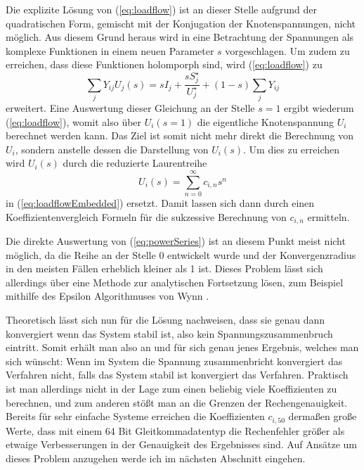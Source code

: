 \documentclass[12pt,a4paper]{article}
\newcommand{\refeq}[1]{{(\ref{eq:#1})}}
\begin{document}
	Die explizite Lösung von \refeq{loadflow} ist an dieser Stelle aufgrund der quadratischen Form, gemischt mit der Konjugation der Knotenspannungen, nicht möglich. Aus diesem Grund heraus wird in \cite{helmPatentSept2009} eine Betrachtung der Spannungen als komplexe Funktionen in einem neuen Parameter $s$ vorgeschlagen. Um zudem zu erreichen, dass diese Funktionen holomporph sind, wird \refeq{loadflow} zu 
	\begin{equation}
		\sum_j Y_{ij} U_{j}(s) = s I_j + \frac{s S_j^\star}{U_j^\star} + (1 - s) \sum_j Y_{ij}
		\label{eq:loadflowEmbedded}
	\end{equation}
	erweitert. Eine Auswertung dieser Gleichung an der Stelle $s = 1$ ergibt wiederum \refeq{loadflow}, womit also über $U_i(s = 1)$ die eigentliche Knotenspannung $U_i$ berechnet werden kann. Das Ziel ist somit nicht mehr direkt die Berechnung von $U_i$, sondern anstelle dessen die Darstellung von $U_i(s)$. Um dies zu erreichen wird $U_i(s)$ durch die reduzierte Laurentreihe 
	\begin{equation}
		U_i(s) = \sum_{n = 0}^\infty c_{i,n} s^n
		\label{eq:powerSeries}
	\end{equation}
	in \refeq{loadflowEmbedded} ersetzt. Damit lassen sich dann durch einen Koeffizientenvergleich Formeln für die sukzessive Berechnung von $c_{i,n}$ ermitteln.
	
	Die direkte Auswertung von \refeq{powerSeries} ist an diesem Punkt meist nicht möglich, da die Reihe an der Stelle 0 entwickelt wurde und der Konvergenzradius in den meisten Fällen erheblich kleiner als 1 ist. Dieses Problem lässt sich allerdings über eine Methode zur analytischen Fortsetzung lösen, zum Beispiel mithilfe des Epsilon Algorithmuses von Wynn \cite{epsilonWynn}.
	
	Theoretisch lässt sich nun für die Lösung nachweisen, dass sie genau dann konvergiert wenn das System stabil ist, also kein Spannungszusammenbruch eintritt. Somit erhält man also an und für sich genau jenes Ergebnis, welches man sich wünscht: Wenn im System die Spannung zusammenbricht konvergiert das Verfahren nicht, falls das System stabil ist konvergiert das Verfahren. Praktisch ist man allerdings nicht in der Lage zum einen beliebig viele Koeffizienten zu berechnen, und zum anderen stößt man an die Grenzen der Rechengenauigkeit. Bereits für sehr einfache Systeme erreichen die Koeffizienten $c_{i,50}$ dermaßen große Werte, dass mit einem 64 Bit Gleitkommadatentyp die Rechenfehler größer als etwaige Verbesserungen in der Genauigkeit des Ergebnisses sind. Auf Ansätze um dieses Problem anzugehen werde ich im nächsten Abschnitt eingehen.
	
\end{document}
